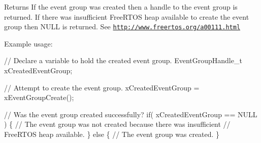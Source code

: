 \begin{DoxyReturn}{Returns}
If the event group was created then a handle to the event group is returned. If there was insufficient Free\+R\+T\+OS heap available to create the event group then N\+U\+LL is returned. See \href{http://www.freertos.org/a00111.html}{\tt http\+://www.\+freertos.\+org/a00111.\+html}
\end{DoxyReturn}
Example usage\+: 
\begin{DoxyPre}
   // Declare a variable to hold the created event group.
   EventGroupHandle\_t xCreatedEventGroup;\end{DoxyPre}



\begin{DoxyPre}   // Attempt to create the event group.
   xCreatedEventGroup = xEventGroupCreate();\end{DoxyPre}



\begin{DoxyPre}   // Was the event group created successfully?
   if( xCreatedEventGroup == NULL )
   \{
    // The event group was not created because there was insufficient
    // FreeRTOS heap available.
   \}
   else
   \{
    // The event group was created.
   \}
  \end{DoxyPre}
 